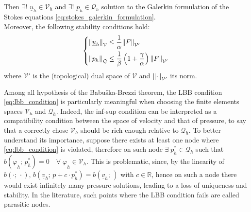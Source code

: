\documentclass[11pt,a4paper]{article}
\newcommand{\R}{\mathds{R}}
\renewcommand{\vec}[1]{\underline{#1}} %
\let\oldforall\forall
\renewcommand{\forall}{\oldforall \; }
\let\oldexists\exists
\renewcommand{\exists}{\oldexists \; }
\begin{document}
\begin{theorem}
\begin{itemize}
\begin{equation}
        \end{equation}
    \end{itemize}
    Then $\oldexists! \, \, \vec{u}_{h} \in \mathcal{V}_{h}$ and $\oldexists! \, \, p_{h} \in \mathcal{Q}_{h}$ solution to the Galerkin formulation of the Stokes equations \eqref{eq:stokes_galerkin_formulation}. \\
    Moreover, the following stability conditions hold:
    \begin{equation*}
        \left\{ \begin{aligned}
            &\norm{\vec{u}_{h}}_{\mathcal{V}} \leq \frac{1}{\alpha} \norm{F}_{\mathcal{V}'} \\
            &\norm{p_{h}}_{\mathcal{Q}} \leq \frac{1}{\beta} \left( 1 + \frac{\gamma}{\alpha} \right) \norm{F}_{\mathcal{V}'}
        \end{aligned} \right.
    \end{equation*}
    where $\mathcal{V}'$ is the (topological) dual space of $\mathcal{V}$ and $\norm{\cdot}_{\mathcal{V}'}$ its norm.
\end{theorem}
Among all hypothesis of the Babuška-Brezzi theorem, the LBB condition \eqref{eq:lbb_condition} is particularly meaningful when choosing the finite elements spaces $\mathcal{V}_{h}$ and $\mathcal{Q}_{h}$. Indeed, the inf-sup condition can be interpreted as a compatibility condition between the space of velocity and that of pressure, to say that a correctly chose $\mathcal{V}_{h}$ should be rich enough relative to $\mathcal{Q}_{h}$. To better understand its importance, suppose there exists at least one node where \eqref{eq:lbb_condition} is violated, therefore on such node $\exists p_{h}^{*} \in \mathcal{Q}_{h}$
such that $b\left(\vec{\varphi}_{h}; \, p_{h}^{*} \right) = 0 \quad \forall \vec{\varphi}_{h} \in \mathcal{V}_{h}$. This is problematic, since, by the linearity of $b(\cdot; \, \cdot)$, $b\left(\vec{v}_{h}; \,p + c \cdot  p_{h}^{*} \right) = b\left(\vec{v}_{h}; \, \right)$ with $c \in \R$, hence on such a node there would exist infinitely many pressure solutions, leading to a loss of uniqueness and stability. In the literature, such points where the LBB condition fails are called parasitic nodes.
\end{document}
